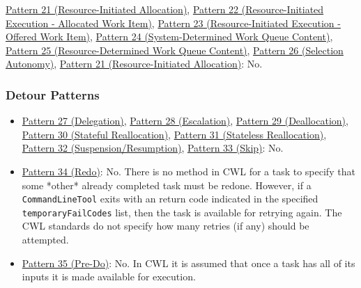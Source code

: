 \href{http://www.workflowpatterns.com/patterns/resource/pull/wrp21.php}{Pattern 21 (Resource-Initiated Allocation)}, \href{http://www.workflowpatterns.com/patterns/resource/pull/wrp22.php}{Pattern 22 (Resource-Initiated Execution - Allocated Work Item)}, \href{http://www.workflowpatterns.com/patterns/resource/pull/wrp23.php}{Pattern 23 (Resource-Initiated Execution - Offered Work Item)}, \href{http://www.workflowpatterns.com/patterns/resource/pull/wrp24.php}{Pattern 24 (System-Determined Work Queue Content)}, \href{http://www.workflowpatterns.com/patterns/resource/pull/wrp25.php}{Pattern 25 (Resource-Determined Work Queue Content)}, \href{http://www.workflowpatterns.com/patterns/resource/pull/wrp26.php}{Pattern 26 (Selection Autonomy)}, \href{http://www.workflowpatterns.com/patterns/resource/pull/wrp21.php}{Pattern 21 (Resource-Initiated Allocation)}: No.

\subsubsection{Detour Patterns}
\begin{itemize}
\item \href{http://www.workflowpatterns.com/patterns/resource/detour/wrp27.php}{Pattern 27 (Delegation)}, \href{http://www.workflowpatterns.com/patterns/resource/detour/wrp28.php}{Pattern 28 (Escalation)}, \href{http://www.workflowpatterns.com/patterns/resource/detour/wrp29.php}{Pattern 29 (Deallocation)}, \href{http://www.workflowpatterns.com/patterns/resource/detour/wrp30.php}{Pattern 30 (Stateful Reallocation)}, \href{http://www.workflowpatterns.com/patterns/resource/detour/wrp31.php}{Pattern 31 (Stateless Reallocation)}, \href{http://www.workflowpatterns.com/patterns/resource/detour/wrp32.php}{Pattern 32 (Suspension/Resumption)}, \href{http://www.workflowpatterns.com/patterns/resource/detour/wrp33.php}{Pattern 33 (Skip)}: No.

\item \href{http://www.workflowpatterns.com/patterns/resource/detour/wrp34.php}{Pattern 34 (Redo)}:  No. There is no method in CWL for a task to specify that some *other* already completed task must be redone. However, if a \verb|CommandLineTool| exits with an return code indicated in the specified \verb|temporaryFailCodes| list, then the task is available for retrying again. The CWL standards do not specify how many retries (if any) should be attempted.

\item \href{http://www.workflowpatterns.com/patterns/resource/detour/wrp35.php}{Pattern 35 (Pre-Do)}: No. In CWL it is assumed that once a task has all of its inputs it is made available for execution.
\end{itemize}
